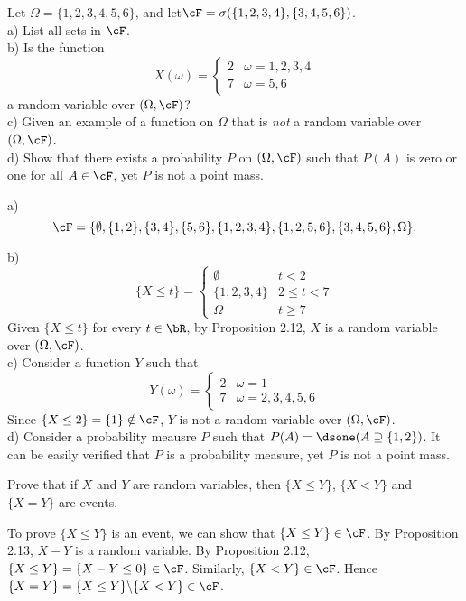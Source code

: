 \begin{exercise}
  Let $\Omega=\{1,2,3,4,5,6\}$, and let$\cF=\sigma(\{1,2,3,4\},\{3, 4, 5, 6\})$. \\
  a) List all sets in $\cF$. \\
  b) Is the function
    \[
      X(\omega) = \begin{cases}
        2 & \omega = 1, 2, 3, 4 \\
        7 & \omega = 5, 6
      \end{cases}
    \]
    a random variable over $(\Omega, \cF)$? \\
  c) Given an example of a function on $\Omega$ that is \textit{not} a random variable over $(\Omega, \cF)$. \\
  d) Show that there exists a probability $P$ on $(\Omega, \cF)$ such that $P(A)$ is zero or one for all $A\in\cF$, yet $P$ is not a point mass.
\end{exercise}
\begin{solution}
  a) \[ \cF = \{ \emptyset, \{1, 2\}, \{3, 4\}, \{5, 6\}, \{1, 2, 3, 4\}, \{1, 2, 5, 6\}, \{3, 4, 5, 6\}, \Omega \} .\]

  b) \[
       \{X\leq t\} = \begin{cases}
         \emptyset & t < 2 \\
         \{1, 2, 3, 4\} & 2 \leq t < 7 \\
         \Omega & t \geq 7
       \end{cases}
     \]
    Given $\{X\leq t\}$ for every $t\in\bR$, by Proposition 2.12, $X$ is a random variable over $(\Omega, \cF)$. \\

  c) Consider a function $Y$ such that
    \[
      Y(\omega) = \begin{cases}
        2 & \omega = 1 \\
        7 & \omega = 2, 3, 4, 5, 6
      \end{cases}
    \]
    Since $\{X\leq 2\} = \{1\}\notin\cF$, $Y$ is not a random variable over $(\Omega, \cF)$. \\

  d) Consider a probability meausre $P$ such that $P(A) = \dsone(A\supseteq\{1, 2\})$. It can be easily verified that $P$ is a probability measure, yet $P$ is not a point mass.

\end{solution}


\begin{exercise}
  Prove that if $X$ and $Y$ are random variables, then $\{X\leq Y\}$, $\{X<Y\}$ and $\{X=Y\}$ are events.
\end{exercise}
\begin{solution}
  To prove $\{X\leq Y\}$ is an event, we can show that $\{X\leq Y\}\in\cF$. By Proposition 2.13, $X-Y$ is a random variable. By Proposition 2.12, $\{X\leq Y\}=\{X-Y\leq 0\}\in\cF$. Similarly, $\{X<Y\}\in\cF$. Hence $\{X=Y\}=\{X\leq Y\}\backslash\{X<Y\}\in\cF$.
\end{solution}



